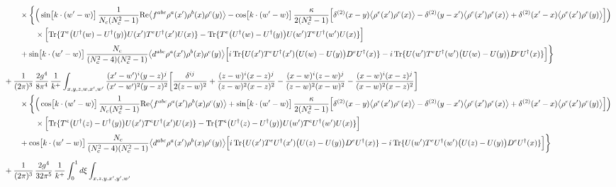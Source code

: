 \documentclass[10pt]{article}
\begin{document}
\begin{align}
&\qquad\times\bigg\{\Big(\sin\!\big[k\cdot(w'-w)\big]\,\frac{1}{N_{c}(N_{c}^{2}-1)}{\rm Re}\big\langle f^{abc}\rho^{a}(x')\rho^{b}(x)\rho^{c}(y)\big\rangle-\cos\!\big[k\cdot(w'-w)\big]\,\frac{\kappa}{2(N_{c}^{2}-1)}\Big[\delta^{(2)}(x-y)\big\langle\rho^{e}(x')\rho^{e}(x)\big\rangle-\delta^{(2)}(y-x')\big\langle\rho^{e}(x')\rho^{e}(x)\big\rangle+\delta^{(2)}(x'-x)\big\langle\rho^{e}(x')\rho^{e}(y)\big\rangle\Big]\Big)\notag\\&\qquad\qquad\times\Big[{\rm Tr}\{T^{e}\big(U^{\dagger}(w)-U^{\dagger}(y)\big)U(x')T^{e}U^{\dagger}(x')U(x)\}-{\rm Tr}\{T^{e}\big(U^{\dagger}(w)-U^{\dagger}(y)\big)U(w')T^{e}U^{\dagger}(w')U(x)\}\Big]\notag\\&\qquad+\sin\!\big[k\cdot(w'-w)\big]\,\frac{N_{c}}{(N_{c}^{2}-4)(N_{c}^{2}-1)}\big\langle d^{abc}\rho^{a}(x')\rho^{b}(x)\rho^{c}(y)\big\rangle\Big[i\,{\rm Tr}\{U(x')T^{e}U^{\dagger}(x')\big(U(w)-U(y)\big)D^{e}U^{\dagger}(x)\}-i\,{\rm Tr}\{U(w')T^{e}U^{\dagger}(w')\big(U(w)-U(y)\big)D^{e}U^{\dagger}(x)\}\Big]\bigg\}\notag\\[6pt]
&+\frac{1}{(2\pi)^{3}}\,\frac{2g^{4}}{8\pi^{4}}\,\frac{1}{k^{+}}\int_{x,y,z,w,x',w'}\frac{(x'-w')^{i}(y-z)^{j}}{(x'-w')^{2}(y-z)^{2}}\bigg[\frac{\delta^{ij}}{2(z-w)^{2}}+\frac{(z-w)^{i}(x-z)^{j}}{(z-w)^{2}(x-z)^{2}}-\frac{(x-w)^{i}(z-w)^{j}}{(z-w)^{2}(x-w)^{2}}-\frac{(x-w)^{i}(x-z)^{j}}{(x-w)^{2}(x-z)^{2}}\bigg]\notag\\
&\qquad\times\bigg\{\Big(\cos\!\big[k\cdot(w'-w)\big]\,\frac{1}{N_{c}(N_{c}^{2}-1)}{\rm Re}\big\langle f^{abc}\rho^{a}(x')\rho^{b}(x)\rho^{c}(y)\big\rangle+\sin\!\big[k\cdot(w'-w)\big]\,\frac{\kappa}{2(N_{c}^{2}-1)}\Big[\delta^{(2)}(x-y)\big\langle\rho^{e}(x')\rho^{e}(x)\big\rangle-\delta^{(2)}(y-x')\big\langle\rho^{e}(x')\rho^{e}(x)\big\rangle+\delta^{(2)}(x'-x)\big\langle\rho^{e}(x')\rho^{e}(y)\big\rangle\Big]\Big)\notag\\&\qquad\qquad\times\Big[{\rm Tr}\{T^{e}\big(U^{\dagger}(z)-U^{\dagger}(y)\big)U(x')T^{e}U^{\dagger}(x')U(x)\}-{\rm Tr}\{T^{e}\big(U^{\dagger}(z)-U^{\dagger}(y)\big)U(w')T^{e}U^{\dagger}(w')U(x)\}\Big]\notag\\&\qquad+\cos\!\big[k\cdot(w'-w)\big]\,\frac{N_{c}}{(N_{c}^{2}-4)(N_{c}^{2}-1)}\big\langle d^{abc}\rho^{a}(x')\rho^{b}(x)\rho^{c}(y)\big\rangle\Big[i\,{\rm Tr}\{U(x')T^{e}U^{\dagger}(x')\big(U(z)-U(y)\big)D^{e}U^{\dagger}(x)\}-i\,{\rm Tr}\{U(w')T^{e}U^{\dagger}(w')\big(U(z)-U(y)\big)D^{e}U^{\dagger}(x)\}\Big]\bigg\}\notag\\[6pt]
&+\frac{1}{(2\pi)^{3}}\,\frac{2g^{4}}{32\pi^{5}}\,\frac{1}{k^{+}}\int_{0}^{1}d\xi\int_{x,z,y,x',y',w'}\notag\\

\end{align}
\end{document}
